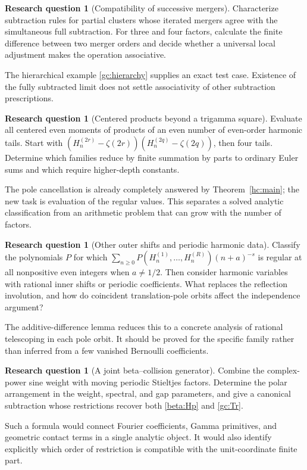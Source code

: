 \documentclass[11pt]{article}
\numberwithin{equation}{section}
\theoremstyle{definition}
\newtheorem{question}[theorem]{Research question}
\theoremstyle{remark}
\begin{document}
\begin{question}[Compatibility of successive mergers]
Characterize subtraction rules for partial clusters whose iterated
mergers agree with the simultaneous full subtraction. For three and
four factors, calculate the finite difference between two merger orders
and decide whether a universal local adjustment makes the operation
associative.
\end{question}
The hierarchical example \eqref{gc:hierarchy} supplies an exact test
case. Existence of the fully subtracted limit does not settle
associativity of other subtraction prescriptions.

\begin{question}[Centered products beyond a trigamma square]
Evaluate all centered even moments of products of an even number of
even-order harmonic tails. Start with
$(H_n^{(2r)}-\zeta(2r))(H_n^{(2q)}-\zeta(2q))$, then four tails.
Determine which families reduce by finite summation by parts to
ordinary Euler sums and which require higher-depth constants.
\end{question}
The pole cancellation is already completely answered by
Theorem~\ref{hc:main}; the new task is evaluation of the regular values.
This separates a solved analytic classification from an arithmetic
problem that can grow with the number of factors.

\begin{question}[Other outer shifts and periodic harmonic data]
Classify the polynomials $P$ for which
$\sum_{n\ge0}P(H_n^{(1)},\ldots,H_n^{(R)})(n+a)^{-s}$ is regular
at all nonpositive even integers when $a\ne1/2$.
Then consider harmonic variables with rational inner shifts or periodic
coefficients. What replaces the reflection involution, and how do
coincident translation-pole orbits affect the independence argument?
\end{question}
The additive-difference lemma reduces this to a concrete analysis of
rational telescoping in each pole orbit. It should be proved for the
specific family rather than inferred from a few vanished Bernoulli
coefficients.

\begin{question}[A joint beta--collision generator]
Combine the complex-power sine weight with moving periodic Stieltjes
factors. Determine the polar arrangement in the weight, spectral, and
gap parameters, and give a canonical subtraction whose restrictions
recover both \eqref{beta:Hp} and \eqref{gc:Tr}.
\end{question}
Such a formula would connect Fourier coefficients, Gamma primitives,
and geometric contact terms in a single analytic object. It would also
identify explicitly which order of restriction is compatible with the
unit-coordinate finite part.
\end{document}
